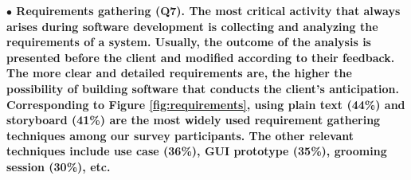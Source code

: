 % 
% 
% 
% 
\nd\bf{$\bullet$ Requirements gathering (Q7).} The most critical activity that always arises
during software development is collecting and analyzing the requirements of a
system. Usually, the outcome of the analysis is presented before the client and
modified according to their feedback. The more clear and detailed requirements
are, the higher the possibility of building software that conducts the client’s
anticipation. Corresponding to Figure \ref{fig:requirements}, using plain text
(44\%) and storyboard (41\%) are the most widely used requirement gathering
techniques among our survey participants. The other relevant techniques include
use case (36\%), GUI prototype (35\%), grooming session (30\%), etc. 

